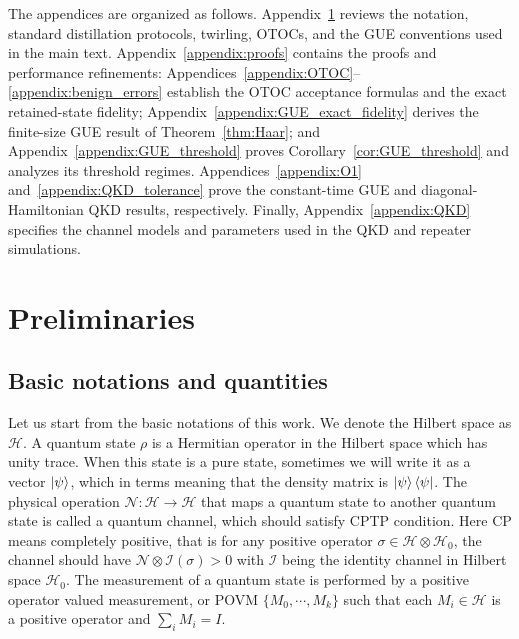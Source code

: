 \documentclass[onecolumn,prx,longbibliography,nofootinbib, superscriptaddress]{revtex4-2}
\theoremstyle{recap}
\begin{document}
The appendices are organized as follows. Appendix~\ref{appendix:preliminaries} reviews the notation, standard distillation protocols, twirling, OTOCs, and the GUE conventions used in the main text. Appendix~\ref{appendix:proofs} contains the proofs and performance refinements: Appendices~\ref{appendix:OTOC}--\ref{appendix:benign_errors} establish the OTOC acceptance formulas and the exact retained-state fidelity; Appendix~\ref{appendix:GUE_exact_fidelity} derives the finite-size GUE result of Theorem~\ref{thm:Haar}; and Appendix~\ref{appendix:GUE_threshold} proves Corollary~\ref{cor:GUE_threshold} and analyzes its threshold regimes. Appendices~\ref{appendix:O1} and~\ref{appendix:QKD_tolerance} prove the constant-time GUE and diagonal-Hamiltonian QKD results, respectively. Finally, Appendix~\ref{appendix:QKD} specifies the channel models and parameters used in the QKD and repeater simulations.


\section{Preliminaries}\label{appendix:preliminaries}
\subsection{Basic notations and quantities}
Let us start from the basic notations of this work. We denote the Hilbert space as $\mathcal{H}$. A quantum state $\rho$ is a Hermitian operator in the Hilbert space which has unity trace. When this state is a pure state, sometimes we will write it as a vector $\ket{\psi}$, which in terms meaning that the density matrix is $\ket{\psi}\bra{\psi}$. The physical operation $\mathcal{N}:\mathcal{H}\rightarrow\mathcal{H}$ that maps a quantum state to another quantum state is called a quantum channel, which should satisfy CPTP condition. Here CP means completely positive, that is for any positive operator $\sigma\in\mathcal{H}\otimes\mathcal{H}_0$, the channel should have $\mathcal{N}\otimes\mathcal{I}(\sigma)>0$ with $\mathcal{I}$ being the identity channel in Hilbert space $\mathcal{H}_0$. The measurement of a quantum state is performed by a positive operator valued measurement, or POVM $\{M_0,\cdots, M_{k}\}$ such that each $M_i\in\mathcal{H}$ is a positive operator and $\sum_{i}M_i=I$.
\end{document}
